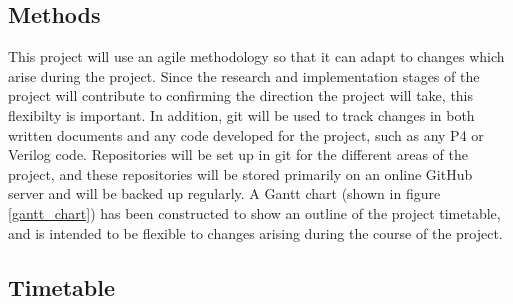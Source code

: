 \documentclass[12pt, a4paper, twoside, onecolumn]{IEEEtran}
\begin{document}
\subsection{Methods}
\label{methods}
This project will use an agile methodology so that it can adapt to changes which arise during the project. Since the research and implementation stages of the project will contribute to confirming the direction the project will take, this flexibilty is important. In addition, git \cite{git} will be used to track changes in both written documents and any code developed for the project, such as any P4 or Verilog code. Repositories will be set up in git for the different areas of the project, and these repositories will be stored primarily on an online GitHub \cite{github} server and will be backed up regularly. A Gantt chart (shown in figure \ref{gantt_chart}) has been constructed to show an outline of the project timetable, and is intended to be flexible to changes arising during the course of the project.

\subsection{Timetable}
\label{timetable}
\end{document}
